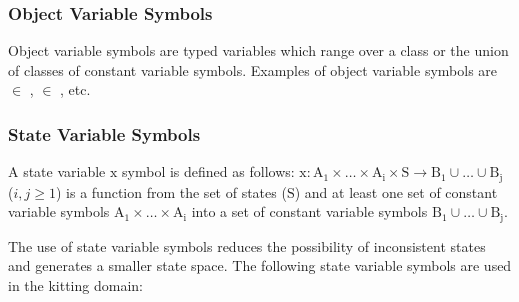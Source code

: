 \subsubsection{Object Variable Symbols}
Object variable symbols are typed variables which range over a class or the union of classes of constant variable symbols. Examples of object variable symbols are  $\in$ ,  $\in$ , etc.

\subsubsection{State Variable Symbols}
\label{subsubsect:State_Variable_Symbols}
A state variable $\mathrm{x}$ symbol is defined as follows:
$\mathrm{x: A_1\times \dots\times A_i\times S\rightarrow B_1\cup\dots\cup B_j}$ ($i, j\geq 1$) is a function from the set of states ($\mathrm{S}$) and at least one set of constant variable symbols $\mathrm{A_1\times \dots\times A_i}$ into a set of constant variable symbols $\mathrm{B_1\cup\dots\cup B_j}$.

The use of state variable symbols reduces the possibility of inconsistent states and generates a smaller state space. The following state variable symbols are used in the kitting domain:


